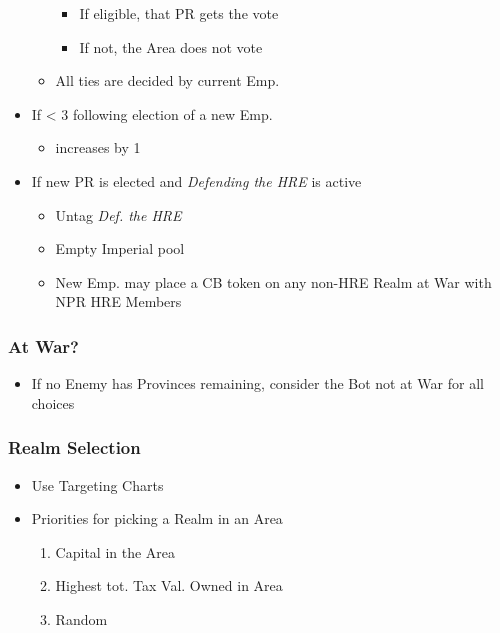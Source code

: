 \documentclass[10pt]{article}
\begin{document}
\begin{itemize}
\begin{itemize}
\begin{itemize}
			\item If eligible, that PR gets the vote
			\item If not, the Area does not vote
		\end{itemize}
		\item All ties are decided by current Emp.
	\end{itemize}
	\item If \authority < 3 following election of a new Emp.
	\begin{itemize}
		\item \authority increases by 1
	\end{itemize}
	\item If new PR is elected and \emph{Defending the HRE} is active
	\begin{itemize}
		\item Untag \emph{Def. the HRE}
		\item Empty Imperial \manpower pool
		\item New Emp. may place a CB token on any non-HRE Realm at War with NPR HRE Members
	\end{itemize}
\end{itemize}


\botrules %

\subsubsection*{At War?}
\begin{itemize}
	\item If no Enemy has Provinces remaining, consider the Bot not at War for all choices
\end{itemize}

\subsubsection*{Realm Selection}
\begin{itemize}
	\item Use Targeting Charts
	\item Priorities for picking a Realm in an Area
	\begin{enumerate}
		\item Capital in the Area
		\item Highest tot. Tax Val. Owned in Area
		\item Random
	\end{enumerate}
\end{itemize}
\end{document}
